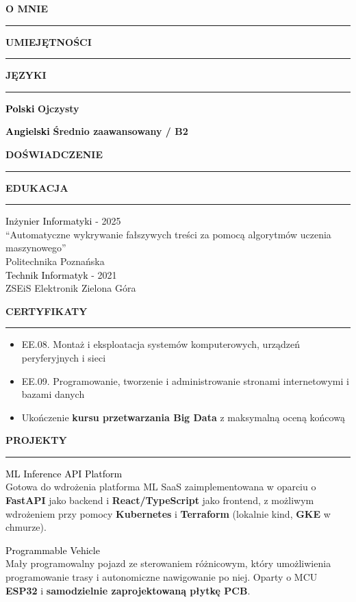 \documentclass[a4paper,11pt]{article}
\newcommand{\CVSectionHeader}{%
    \headingfont\bfseries\fontsize{20pt}{22pt}\selectfont
    \color{secheadercolor}%
}
\newcommand{\CVSection}[2]{%
    \par
    {\CVSectionHeader \uppercase{#1}}\\
    \textcolor{hrcolor}{\rule{\textwidth}{0.1cm}}\vspace{0.2cm}
    #2
}
\newcommand{\ProjectsEntry}[3]{%
    {\fontsize{12pt}{10pt}\selectfont\textcolor{black}{#1} \href{#2}{\textcolor{accentcolor}{\faGithub}}}\\
    {\fontsize{8pt}{10pt}\selectfont#3}
}
\newcommand{\CVEduEntry}[3]{
    {\fontsize{12pt}{10pt}\selectfont \textcolor{black}{#1}}
    \hfill
    {\fontsize{9pt}{5pt}\selectfont #3} \\
    \textcolor{accentcolor}{#2} \\
}
\newcommand{\CVEduEntryExtra}[4]{
    {\fontsize{12pt}{10pt}\selectfont \textcolor{black}{#1}}
    \hfill
    {\fontsize{9pt}{5pt}\selectfont #3} \\
    {\fontsize{9pt}{5pt}\selectfont#4} \\
    \textcolor{accentcolor}{#2} \\
}
\newcommand{\CVCertificate}[1]{
    \item \fontsize{10pt}{5pt}\selectfont #1
}
\newcommand{\CVLanguage}[2]{
    {\fontsize{10pt}{5pt}\selectfont \textcolor{black}{\textbf{#1}} \hfill \textbf{#2}\\}
}
\newcommand{\dashedline}{
    \hdashrule{\textwidth}{0.5pt}{0.1cm}
}
\begin{document}
\begin{minipage}[t]{0.38\textwidth}
    \CVSection{O mnie}{{\fontsize{10pt}{12pt}\selectfont
    }}
    \vspace{0.5cm}
    \CVSection{Umiejętności}{
    }
    \vspace{0.5cm}
    \CVSection{Języki}{
        \CVLanguage{Polski}{Ojczysty}
        \dashedline
        \CVLanguage{Angielski}{Średnio zaawansowany / B2}
    }
\end{minipage}
\hfill
\begin{minipage}[t]{0.58\textwidth}
    \CVSection{Doświadczenie}{
    }
    \vspace{0.5cm}
    \CVSection{Edukacja}{
        \CVEduEntryExtra{Inżynier Informatyki}{Politechnika Poznańska}{2021 - 2025}{``Automatyczne wykrywanie fałszywych treści za pomocą algorytmów uczenia maszynowego''}
        
        \CVEduEntry{Technik Informatyk}{ZSEiS Elektronik Zielona Góra}{2017 - 2021}
    }
    \CVSection{Certyfikaty}{
        \begin{itemize}[leftmargin=*, topsep=0pt]\itemsep0em
            \CVCertificate{EE.08. Montaż i eksploatacja systemów komputerowych, urządzeń peryferyjnych i sieci}
            \CVCertificate{EE.09. Programowanie, tworzenie i administrowanie stronami internetowymi i bazami danych}
            \CVCertificate{Ukończenie \textbf{kursu przetwarzania Big Data} z maksymalną oceną końcową}
        \end{itemize}
    }
    \vspace{0.3cm}
    \CVSection{Projekty}{
        \ProjectsEntry{ML Inference API Platform}{https://github.com/jegor377/mlops-project}{
            Gotowa do wdrożenia platforma ML SaaS zaimplementowana w oparciu o \textbf{FastAPI} jako backend i \textbf{React/TypeScript} jako frontend, z możliwym wdrożeniem przy pomocy \textbf{Kubernetes} i \textbf{Terraform} (lokalnie kind, \textbf{GKE} w chmurze).
        }

        \vspace{0.1cm}

        \ProjectsEntry{Programmable Vehicle}{https://github.com/jegor377/programmable-vehicle}{
            Mały programowalny pojazd ze sterowaniem różnicowym, który umożliwienia programowanie trasy i autonomiczne nawigowanie po niej. Oparty o MCU \textbf{ESP32} i \textbf{samodzielnie zaprojektowaną płytkę PCB}.
        }
        

    }
\end{minipage}
\end{document}
